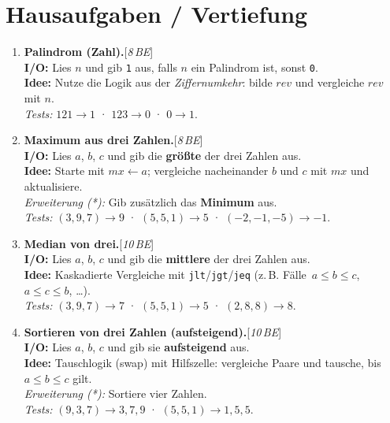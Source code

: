\documentclass[11pt,a4paper]{scrartcl}
\newenvironment{aufgaben}{%
  \begin{enumerate}[leftmargin=*,label=\textbf{Aufgabe~\arabic*:}, itemsep=0.6em]
  }{\end{enumerate}}
\newcommand{\punkte}[1]{\hfill{\small[\textit{#1\,BE}]}}%
\begin{document}
  \section*{Hausaufgaben / Vertiefung}

  \begin{aufgaben}

    \item \textbf{Palindrom (Zahl).}\punkte{8}\\
    \textbf{I/O:} Lies $n$ und gib \texttt{1} aus, falls $n$ ein Palindrom ist, sonst \texttt{0}.\\
    \textbf{Idee:} Nutze die Logik aus der \emph{Ziffernumkehr}: bilde $rev$ und vergleiche $rev$ mit $n$.\\
    \emph{Tests:} $121\to 1$ \;·\; $123\to 0$ \;·\; $0\to 1$.

    \item \textbf{Maximum aus drei Zahlen.}\punkte{8}\\
    \textbf{I/O:} Lies $a$, $b$, $c$ und gib die \textbf{größte} der drei Zahlen aus.\\
    \textbf{Idee:} Starte mit $mx\gets a$; vergleiche nacheinander $b$ und $c$ mit $mx$ und aktualisiere.\\
    \emph{Erweiterung (*):} Gib zusätzlich das \textbf{Minimum} aus.\\
    \emph{Tests:} $(3,9,7)\to 9$ \;·\; $(5,5,1)\to 5$ \;·\; $(-2,-1,-5)\to -1$.

    \item \textbf{Median von drei.}\punkte{10}\\
    \textbf{I/O:} Lies $a$, $b$, $c$ und gib die \textbf{mittlere} der drei Zahlen aus.\\
    \textbf{Idee:} Kaskadierte Vergleiche mit \texttt{jlt}/\texttt{jgt}/\texttt{jeq} (z.\,B. Fälle \,$a\le b\le c$, $a\le c\le b$, \dots).\\
    \emph{Tests:} $(3,9,7)\to 7$ \;·\; $(5,5,1)\to 5$ \;·\; $(2,8,8)\to 8$.

    \item \textbf{Sortieren von drei Zahlen (aufsteigend).}\punkte{10}\\
    \textbf{I/O:} Lies $a$, $b$, $c$ und gib sie \textbf{aufsteigend} aus.\\
    \textbf{Idee:} Tauschlogik (swap) mit Hilfszelle: vergleiche Paare und tausche, bis $a\le b\le c$ gilt.\\
    \emph{Erweiterung (*):} Sortiere vier Zahlen.\\
    \emph{Tests:} $(9,3,7)\to 3,7,9$ \;·\; $(5,5,1)\to 1,5,5$.


\end{aufgaben}
\end{document}
